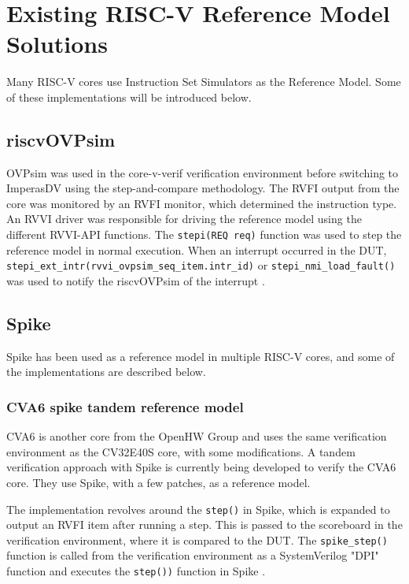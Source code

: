 \section{Existing RISC-V Reference Model Solutions}
\label{sec:bg_existingReference}

Many RISC-V cores use Instruction Set Simulators as the Reference Model. Some of these implementations will be introduced below.

\subsection{riscvOVPsim}

OVPsim was used in the core-v-verif verification environment before switching to ImperasDV using the step-and-compare methodology. The RVFI output from the core was monitored by an RVFI monitor, which determined the instruction type. An RVVI driver was responsible for driving the reference model using the different RVVI-API functions. The \lstinline{stepi(REQ req)} function was used to step the reference model in normal execution. When an interrupt occurred in the DUT, \lstinline{stepi_ext_intr(rvvi_ovpsim_seq_item.intr_id)} or \lstinline{stepi_nmi_load_fault()} was used to notify the riscvOVPsim of the interrupt \cite{openhwgroupOpenhwgroupCorevverif2023}.

\subsection{Spike}

Spike has been used as a reference model in multiple RISC-V cores, and some of the implementations are described below.

\subsubsection{CVA6 spike tandem reference model}
\label{back:cva6}

CVA6 is another core from the OpenHW Group and uses the same verification environment as the CV32E40S core, with some modifications. A tandem verification approach with Spike is currently being developed to verify the CVA6 core. They use Spike, with a few patches, as a reference model.

The implementation revolves around the \lstinline{step()} in Spike, which is expanded to output an RVFI item after running a step. This is passed to the scoreboard in the verification environment, where it is compared to the DUT. The \lstinline{spike_step()} function is called from the verification environment as a SystemVerilog "DPI" function and executes the \lstinline{step())} function in Spike \cite{openhwgroupOpenhwgroupCorevverif2023}.

